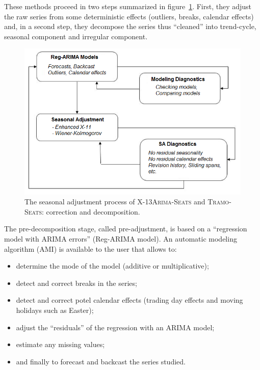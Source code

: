 \documentclass[12pt, a4paper]{article}
\begin{document}
These methods proceed in two steps summarized in figure~\ref{fig:X13TS}. First, they adjust the raw series from some deterministic effects (outliers, breaks, calendar effects) and, in a second step, they decompose the series thus ``cleaned'' into trend-cycle, seasonal component and irregular component.

\begin{figure}[!ht]
\begin{center}
 \includegraphics[scale=0.8]{img/MethodesX13-TS.png}
 \caption{The seasonal adjustment process of \textsc{X-13Arima-Seats} and \textsc{Tramo-Seats}: correction and decomposition.}
 \label{fig:X13TS}
\end{center}
\end{figure}

The pre-decomposition stage, called pre-adjustment, is based on a ``regression model with ARIMA errors'' (Reg-ARIMA model). An automatic modeling algorithm (AMI) is available to the user that allows to:

\begin{itemize}
  \item determine the mode of the model (additive or multiplicative);
	\item detect and correct breaks in the series; 
	\item detect and correct potel calendar effects (trading day effects and moving holidays such as Easter);
	\item adjust the ``residuals'' of the regression with an ARIMA model;
	\item estimate any missing values;
	\item and finally to forecast and backcast the series studied.
\end{itemize}
\end{document}
